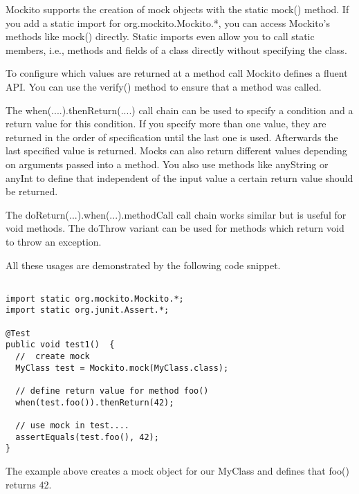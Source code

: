 \documentclass{article}
\begin{document}
Mockito supports the creation of mock objects with the static
mock() method. If you add a static import for org.mockito.Mockito.*, you can
access Mockito's methods like mock() directly. Static imports even allow
you to call static members, i.e., methods and fields of a class
directly without specifying the class. 

To configure which values are returned at a method call Mockito
defines a fluent API. You can use the verify() method to ensure that a
method was called. 

The when(....).thenReturn(....) call chain can be used to specify a
condition and a return value for this condition. If you specify more
than one value, they are returned in the order of specification until
the last one is used. Afterwards the last specified value is
returned. Mocks can also return different values depending on
arguments passed into a method. You also use methods like anyString or
anyInt to define that independent of the input value a certain return
value should be returned. 

The doReturn(...).when(...).methodCall call chain works similar but is
useful for void methods. The doThrow variant can be used for methods
which return void to throw an exception. 


All these usages are demonstrated by the following code snippet. 



\begin{lstlisting}

import static org.mockito.Mockito.*;
import static org.junit.Assert.*;

@Test
public void test1()  {
  //  create mock
  MyClass test = Mockito.mock(MyClass.class);
  
  // define return value for method foo()
  when(test.foo()).thenReturn(42);
  
  // use mock in test.... 
  assertEquals(test.foo(), 42);
}

\end{lstlisting}

The example above creates a mock object for our MyClass and defines
that foo() returns 42.
\end{document}

